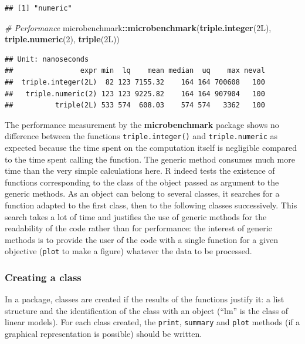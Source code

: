 \documentclass[
  12pt,
  american,
  a4paper,
  extrafontsizes,onecolumn,openright
  ]{memoir}
\newenvironment{Shaded}{\begin{snugshade}}{\end{snugshade}}
\newcommand{\CommentTok}[1]{\textcolor[rgb]{0.56,0.35,0.01}{\textit{#1}}}
\newcommand{\DataTypeTok}[1]{\textcolor[rgb]{0.13,0.29,0.53}{#1}}
\newcommand{\DecValTok}[1]{\textcolor[rgb]{0.00,0.00,0.81}{#1}}
\newcommand{\FunctionTok}[1]{\textcolor[rgb]{0.13,0.29,0.53}{\textbf{#1}}}
\newcommand{\NormalTok}[1]{#1}
\newcommand{\SpecialCharTok}[1]{\textcolor[rgb]{0.81,0.36,0.00}{\textbf{#1}}}
\newlength{\rf}
\begin{document}
\begin{verbatim}
## [1] "numeric"
\end{verbatim}

\begin{Shaded}
\begin{Highlighting}[]
\CommentTok{\# Performance}
\NormalTok{microbenchmark}\SpecialCharTok{::}\FunctionTok{microbenchmark}\NormalTok{(}\FunctionTok{triple.integer}\NormalTok{(}\DecValTok{2}\DataTypeTok{L}\NormalTok{), }\FunctionTok{triple.numeric}\NormalTok{(}\DecValTok{2}\NormalTok{),}
    \FunctionTok{triple}\NormalTok{(}\DecValTok{2}\DataTypeTok{L}\NormalTok{))}
\end{Highlighting}
\end{Shaded}

\begin{verbatim}
## Unit: nanoseconds
##                expr min  lq    mean median  uq    max neval
##  triple.integer(2L)  82 123 7155.32    164 164 700608   100
##   triple.numeric(2) 123 123 9225.82    164 164 907904   100
##          triple(2L) 533 574  608.03    574 574   3362   100
\end{verbatim}

\normalsize

The performance measurement by the \textbf{microbenchmark} package shows no difference between the functions \texttt{triple.integer()} and \texttt{triple.numeric} as expected because the time spent on the computation itself is negligible compared to the time spent calling the function.
The generic method consumes much more time than the very simple calculations here.
R indeed tests the existence of functions corresponding to the class of the object passed as argument to the generic methods.
As an object can belong to several classes, it searches for a function adapted to the first class, then to the following classes successively.
This search takes a lot of time and justifies the use of generic methods for the readability of the code rather than for performance: the interest of generic methods is to provide the user of the code with a single function for a given objective (\texttt{plot} to make a figure) whatever the data to be processed.

\subsubsection{Creating a class}\label{creating-a-class}

In a package, classes are created if the results of the functions justify it: a list structure and the identification of the class with an object (\enquote{lm} is the class of linear models).
For each class created, the \texttt{print}, \texttt{summary} and \texttt{plot} methods (if a graphical representation is possible) should be written.
\end{document}
